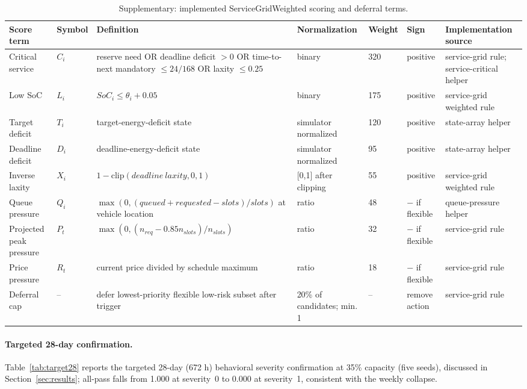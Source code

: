 \documentclass[12pt]{article}
\begin{document}
\begin{table}[H]
\centering
\caption{Supplementary: implemented ServiceGridWeighted scoring and deferral terms.}
\label{tab:sgwterms}
\tiny
\begin{tabularx}{\textwidth}{p{}p{}Yp{0.12\textwidth}p{0.07\textwidth}p{0.09\textwidth}p{0.14\textwidth}}
\hline
Score term & Symbol & Definition & Normalization & Weight & Sign & Implementation source \\
\hline
Critical service & $C_i$ & reserve need OR deadline deficit $>0$ OR time-to-next mandatory $\leq 24/168$ OR laxity $\leq 0.25$ & binary & 320 & positive & service-grid rule; service-critical helper \\
Low SoC & $L_i$ & $SoC_i \leq \theta_i+0.05$ & binary & 175 & positive & service-grid weighted rule \\
Target deficit & $T_i$ & target-energy-deficit state & simulator normalized & 120 & positive & state-array helper \\
Deadline deficit & $D_i$ & deadline-energy-deficit state & simulator normalized & 95 & positive & state-array helper \\
Inverse laxity & $X_i$ & $1-\mathrm{clip}(deadline\ laxity,0,1)$ & [0,1] after clipping & 55 & positive & service-grid weighted rule \\
Queue pressure & $Q_i$ & $\max(0,(queued+requested-slots)/slots)$ at vehicle location & ratio & 48 & $-$ if flexible & queue-pressure helper \\
Projected peak pressure & $P_t$ & $\max(0,(n_{req}-0.85n_{slots})/n_{slots})$ & ratio & 32 & $-$ if flexible & service-grid rule \\
Price pressure & $R_t$ & current price divided by schedule maximum & ratio & 18 & $-$ if flexible & service-grid rule \\
Deferral cap & -- & defer lowest-priority flexible low-risk subset after trigger & 20\% of candidates; min. 1 & -- & remove action & service-grid rule \\
\hline
\end{tabularx}
\end{table}

\paragraph{Targeted 28-day confirmation.} Table~\ref{tab:target28} reports the targeted 28-day (672 h) behavioral severity confirmation at 35\% capacity (five seeds), discussed in Section~\ref{sec:results}; all-pass falls from 1.000 at severity~0 to 0.000 at severity~1, consistent with the weekly collapse.
\end{document}
